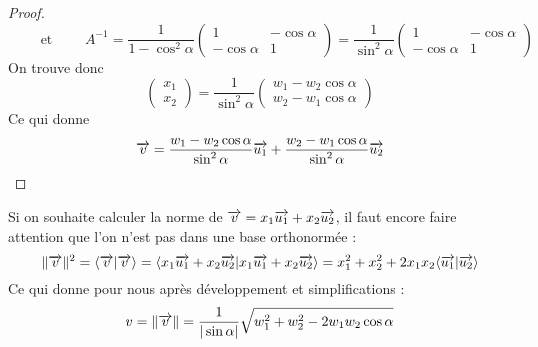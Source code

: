 \documentclass[class=report,crop=false]{standalone}
\begin{document}
\begin{proof}
$$\qquad\text{ et }\qquad 
A^{-1} = \frac{1}{1-\cos^2 \alpha}\begin{pmatrix}1&-\cos \alpha \\ -\cos \alpha & 1\end{pmatrix}
= \frac{1}{\sin^2 \alpha}\begin{pmatrix}1&-\cos \alpha \\ -\cos \alpha & 1\end{pmatrix} $$
On trouve donc
$$\begin{pmatrix}x_1\\x_2\end{pmatrix}
=\frac{1}{\sin^2 \alpha} 
\begin{pmatrix} w_1 - w_2 \cos\alpha  \\ w_2 -w_1 \cos \alpha \end{pmatrix}$$
Ce qui donne
$$\overrightarrow v = \frac{w_1 - w_2 \cos\alpha}{\sin^2\alpha} \overrightarrow{u_1} + 
 \frac{w_2 -w_1 \cos \alpha}{\sin^2\alpha} \overrightarrow{u_2}$$

\end{proof}


Si on souhaite calculer la norme de $\overrightarrow v = x_1 \overrightarrow{u_1} + x_2 \overrightarrow{u_2}$,
il faut encore faire attention que l'on n'est pas dans une base orthonormée :
$$ \| \overrightarrow v \|^2 = \langle \overrightarrow{v} | \overrightarrow{v} \rangle
= \langle x_1 \overrightarrow{u_1} + x_2 \overrightarrow{u_2} | x_1 \overrightarrow{u_1} + x_2 \overrightarrow{u_2} \rangle
= x_1^2 + x_2^2 + 2 x_1x_2 \langle \overrightarrow{u_1} | \overrightarrow{u_2} \rangle$$
Ce qui donne pour nous 
 après développement et simplifications :
$$v =  \| \overrightarrow v \|
= \frac{1}{|\sin\alpha|}\sqrt{w_1^2 + w_2^2 -2w_1w_2\cos\alpha}
$$
 
\end{document}
